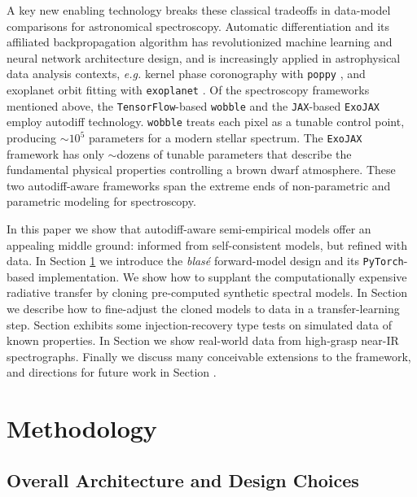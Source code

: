 \documentclass[modern]{aastex631}
\begin{document}
A key new enabling technology breaks these classical tradeoffs in data-model comparisons for astronomical spectroscopy.  Automatic differentiation \citep[``autodiff'',][]{2015arXiv150205767G} and its affiliated backpropagation algorithm has revolutionized machine learning and neural network architecture design, and is increasingly applied in astrophysical data analysis contexts, \emph{e.g.} kernel phase coronography with \texttt{poppy} \citep{2021ApJ...907...40P}, and exoplanet orbit fitting with \texttt{exoplanet} \citep{2021JOSS....6.3285F}.  Of the spectroscopy frameworks mentioned above, the \texttt{TensorFlow}-based \citep{tensorflow2015-whitepaper} \texttt{wobble} and the \texttt{JAX}-based  \texttt{ExoJAX} employ autodiff technology.  \texttt{wobble} treats each pixel as a tunable control point, producing $\sim10^5$ parameters for a modern stellar spectrum.  The \texttt{ExoJAX} framework has only $\sim$dozens of tunable parameters that describe the fundamental physical properties controlling a brown dwarf atmosphere.  These two autodiff-aware frameworks span the extreme ends of non-parametric and parametric modeling for spectroscopy.

In this paper we show that autodiff-aware semi-empirical models offer an appealing middle ground: informed from self-consistent models, but refined with data.  In Section \ref{methodology} we introduce the \emph{blas\'e} forward-model design and its \texttt{PyTorch}-based \cite{2019arXiv191201703P} implementation.  We show how to supplant the computationally expensive radiative transfer by cloning pre-computed synthetic spectral models.  In Section  we describe how to fine-adjust the cloned models to data in a transfer-learning step.  Section  exhibits some injection-recovery type tests on simulated data of known properties.  In Section  we show real-world data from high-grasp near-IR spectrographs.  Finally we discuss many conceivable extensions to the framework, and directions for future work in Section .


\section{Methodology}\label{methodology}

\subsection{Overall Architecture and Design Choices}
\end{document}
